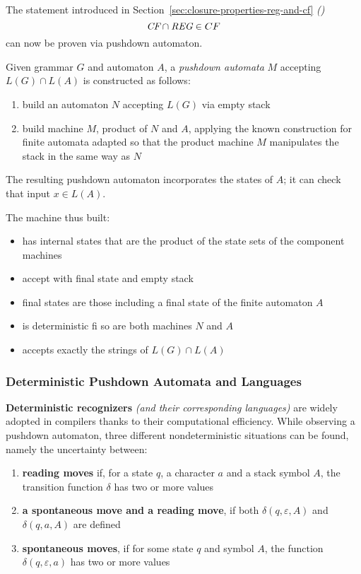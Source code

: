 \documentclass[english]{article}
\begin{document}
The statement introduced in Section~\ref{sec:closure-properties-reg-and-cf} \textit{()}
\[ \textit{CF} \cap \textit{REG} \in CF \]
can now be proven via pushdown automaton.

Given grammar \(G\) and automaton \(A\), a \textit{pushdown automata} \(M\) accepting \(L(G) \cap L(A)\) is constructed as follows:

\begin{enumerate}
  \item build an automaton \(N\) accepting \(L(G)\) via empty stack
  \item build machine \(M\), product of \(N\) and \(A\), applying the known construction for finite automata adapted so that the product machine \(M\) manipulates the stack in the same way as \(N\)
\end{enumerate}

The resulting pushdown automaton incorporates the states of \(A\);
it can check that input \(x \in L(A)\).

The machine thus built:

\begin{itemize}
  \item has internal states that are the product of the state sets of the component machines
  \item accept with final state and empty stack
  \item final states are those including a final state of the finite automaton \(A\)
  \item is deterministic fi so are both machines \(N\) and \(A\)
  \item accepts exactly the strings of \(L(G) \cap L(A)\)
\end{itemize}

\subsubsection{Deterministic Pushdown Automata and Languages}

\textbf{Deterministic recognizers} \textit{(and their corresponding languages)} are widely adopted in compilers thanks to their computational efficiency.
While observing a pushdown automaton, three different nondeterministic situations can be found, namely the uncertainty between:

\begin{enumerate}
  \item \textbf{reading moves} if, for a state \(q\), a character \(a\) and a stack symbol \(A\), the transition function \(\delta\) has two or more values
  \item \textbf{a spontaneous move and a reading move}, if both \(\delta(q, \varepsilon, A)\) and \(\delta(q, a, A)\) are defined
  \item \textbf{spontaneous moves}, if for some state \(q\) and symbol \(A\), the function \(\delta(q, \varepsilon, a)\) has two or more values
\end{enumerate}
\end{document}
